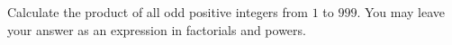 Calculate the product of all odd positive integers from $1$ to $999$. You may leave your answer as an expression in factorials and powers.
